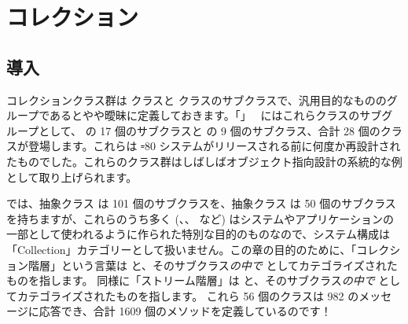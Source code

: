 \documentclass[a4paper,10pt,twoside]{book}
\begin{document}
	\sloppy
\fi
\chapter{コレクション}

\section{導入}

コレクションクラス群は  クラスと  クラスのサブクラスで、汎用目的なもののグループであるとやや曖昧に定義しておきます。「」~\cite{Gold83a} にはこれらクラスのサブグループとして、 の 17 個のサブクラスと   の 9 個のサブクラス、合計 28 個のクラスが登場します。これらは \st-80 システムがリリースされる前に何度か再設計されたものでした。これらのクラス群はしばしばオブジェクト指向設計の系統的な例として取り上げられます。

\pharo では、抽象クラス  は 101 個のサブクラスを、抽象クラス  は 50 個のサブクラスを持ちますが、これらのうち多く (\mbox{、}\mbox{、} など) はシステムやアプリケーションの一部として使われるように作られた特別な目的のものなので、システム構成は「Collection」カテゴリーとして扱いません。この章の目的のために、「コレクション階層」という言葉は  と、そのサブクラス\emph{の中で}  としてカテゴライズされたものを指します。
同様に「ストリーム階層」は  と、そのサブクラス\emph{の中で}  としてカテゴライズされたものを指します。
これら 56 個のクラスは 982 のメッセージに応答でき、合計 1609 個のメソッドを定義しているのです！

\end{document}

